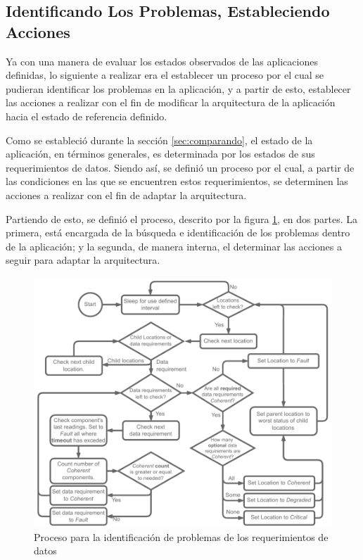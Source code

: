 \subsection{Identificando Los Problemas, Estableciendo Acciones}

Ya con una manera de evaluar los estados observados de las aplicaciones definidas, lo siguiente a realizar era el establecer un proceso por el cual se pudieran identificar los problemas en la aplicación, y a partir de esto, establecer las acciones a realizar con el fin de modificar la arquitectura de la aplicación hacia el estado de referencia definido.

Como se estableció durante la sección \ref{sec:comparando}, el estado de la aplicación, en términos generales, es determinada por los estados de sus requerimientos de datos. Siendo así, se definió un proceso por el cual, a partir de las condiciones en las que se encuentren estos requerimientos, se determinen las acciones a realizar con el fin de adaptar la arquitectura.


Partiendo de esto, se definió el proceso, descrito por la figura \ref{fig:BranProcess}, en dos partes. La primera, está encargada de la búsqueda e identificación de los problemas dentro de la aplicación; y la segunda, de manera interna, el determinar las acciones a seguir para adaptar la arquitectura. 

\begin{figure}[ht]
    \centering
    \caption{Proceso para la identificación de problemas de los requerimientos de datos}
    \label{fig:BranProcess}
    \includegraphics[width=0.85\linewidth]{images/LookerProcessClock.pdf}
\end{figure}

